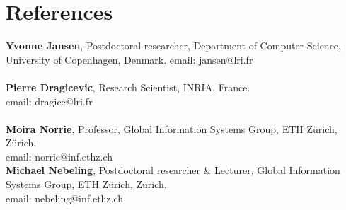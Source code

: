 \documentclass[11pt,a4paper,sans]{moderncv}   %
\begin{document}
\section{References}
\textbf{Yvonne Jansen}, Postdoctoral researcher, Department of Computer Science, University of Copenhagen, Denmark. email: jansen@lri.fr\\\\
\textbf{Pierre Dragicevic}, Research Scientist, INRIA, France.\\email: dragice@lri.fr\\\\
\textbf{Moira Norrie}, Professor, Global Information Systems Group, {ETH Z\"urich}, {Z\"urich}.\\
email: norrie@inf.ethz.ch\\


\textbf{Michael Nebeling}, Postdoctoral researcher \& Lecturer, Global Information Systems Group, {ETH Z\"urich}, {Z\"urich}. \\
email: nebeling@inf.ethz.ch














\end{document}
